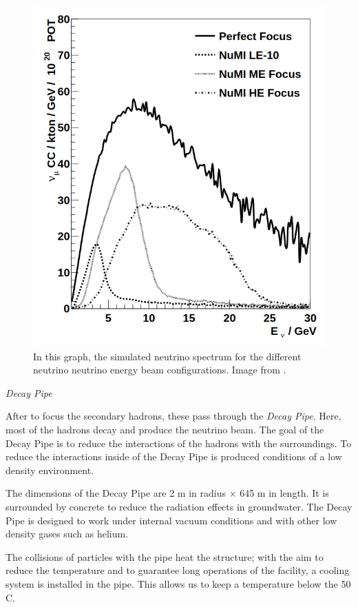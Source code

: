 \begin{figure}[!htb]
\centering
\includegraphics[scale=0.3]{Figures/Chapter2/nuAllSpectrums.png}
        \caption{In this graph, the simulated neutrino spectrum for the different neutrino neutrino energy beam configurations. Image from \cite{Numi}.} 
\label{fig:MnvExp:NuMI:Neutrino spectrum}
\end{figure}

\textit{Decay Pipe}

After to focus the secondary hadrons, these pass through the \textit{Decay Pipe}. Here, most of the hadrons decay and produce the neutrino beam. The goal of the Decay Pipe is to reduce the interactions of the hadrons with the surroundings. To reduce the interactions inside of the Decay Pipe is produced conditions of a low density environment. 

The dimensions of the Decay Pipe are 2 m in radius $\times$ 645 m in length. It is surrounded by concrete to reduce the radiation effects in groundwater. The Decay Pipe is designed to work under internal vacuum conditions and with other low density gases such as helium. 

The collisions of particles with the pipe heat the structure; with the aim to reduce the temperature and to guarantee long operations of the facility, a cooling system is installed in the pipe. This allows us to keep a temperature below the 50 C. 

